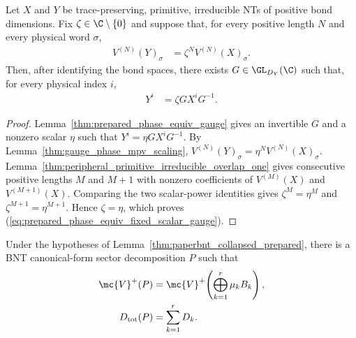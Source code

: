 \begin{lemma}%
    \label{lem:prepared_phase_equiv_fixed_scalar_gauge}
    \leanok
    Let $X$ and $Y$ be trace-preserving, primitive, irreducible NTs of positive
    bond dimensions. Fix $\zeta\in\C\setminus\{0\}$ and suppose that, for every
    positive length $N$
    and every physical word $\sigma$,
    \begin{align}
        V^{(N)}(Y)_\sigma
         & =\zeta^N V^{(N)}(X)_\sigma.
        \label{eq:prepared_phase_equiv_fixed_scalar}
    \end{align}
    Then, after identifying the bond spaces, there exists
    $G\in\GL_{D_Y}(\C)$ such that, for every physical index $i$,
    \begin{align}
        Y^i & =\zeta G X^i G^{-1}.
        \label{eq:prepared_phase_equiv_fixed_scalar_gauge}
    \end{align}
\end{lemma}

\begin{proof}\leanok
    Lemma~\ref{thm:prepared_phase_equiv_gauge} gives an invertible $G$ and a
    nonzero scalar $\eta$ such that $Y^i=\eta G X^iG^{-1}$. By
    Lemma~\ref{thm:gauge_phase_mpv_scaling},
    $V^{(N)}(Y)_\sigma=\eta^N V^{(N)}(X)_\sigma$.
    Lemma~\ref{thm:peripheral_primitive_irreducible_overlap_one} gives
    consecutive positive lengths $M$ and $M+1$ with nonzero coefficients of
    $V^{(M)}(X)$ and $V^{(M+1)}(X)$. Comparing the two scalar-power identities
    gives $\zeta^M=\eta^M$ and $\zeta^{M+1}=\eta^{M+1}$. Hence
    $\zeta=\eta$, which proves
    (\ref{eq:prepared_phase_equiv_fixed_scalar_gauge}).
\end{proof}

\begin{lemma}%
    \label{thm:paperbnt_supplier_prepared_total_dim}
    \leanok
    Under the hypotheses of
    Lemma~\ref{thm:paperbnt_collapsed_prepared}, there is a BNT canonical-form
    sector decomposition $P$ such that
    \begin{align}
        \mc{V}^+(P)
         & =\mc{V}^+\!\left(\bigoplus_{k=1}^r\mu_kB_k\right),
        \notag                                                \\
        D_{\mathrm{tot}}(P)
         & =\sum_{k=1}^r D_k.
        \label{eq:paperbnt_prepared_total_dim}
    \end{align}
\end{lemma}


